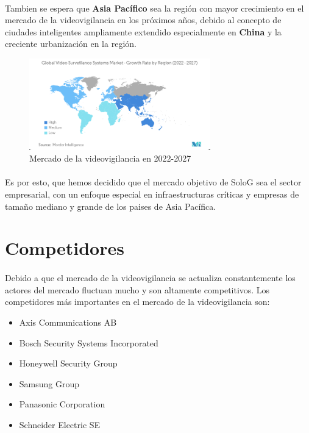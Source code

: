 \documentclass{report}
\begin{document}
        \paragraph*{}
        {
          Tambien se espera que \textbf{Asia Pacífico} sea la región con mayor crecimiento en el mercado de la videovigilancia en los próximos años, debido al concepto de ciudades inteligentes ampliamente extendido especialmente en \textbf{China} y la creciente urbanización en la región.\cite{mordor-video-surveillance}
        }
        \begin{figure}[H]
          \centering
          \includegraphics[width=0.7\textwidth]{./img/ssm.png}
          \caption{Mercado de la videovigilancia en 2022-2027}
        \end{figure}   
        \paragraph{}{
          Es por esto, que hemos decidido que el mercado objetivo de SoloG sea el sector empresarial, con un enfoque especial en infraestructuras críticas y empresas de tamaño mediano y grande de los paises de Asia Pacífica.

        }
      \section{Competidores}
        \paragraph*{}{Debido a que el mercado de la videovigilancia se actualiza constantemente los actores del mercado fluctuan mucho y son altamente competitivos. Los competidores más importantes en el mercado de la videovigilancia son:}
        \begin{multicols}{3}
          \begin{itemize}
            \item Axis Communications AB
            \item Bosch Security Systems Incorporated
            \item Honeywell Security Group
            \item Samsung Group
            \item Panasonic Corporation
            \item Schneider Electric SE
          \end{itemize}
        \end{multicols}
\end{document}
